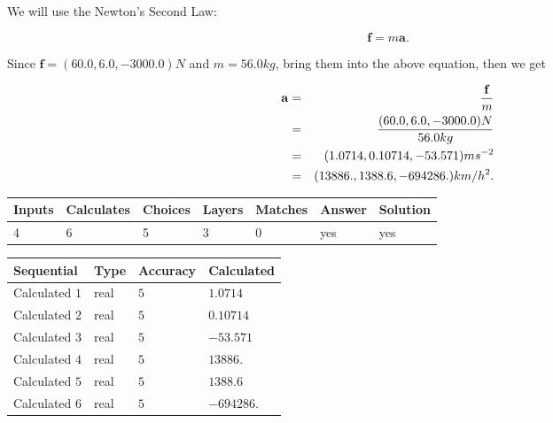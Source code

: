 \documentclass[12pt]{article}
\begin{document}
 

We will use the Newton's Second Law:
 
\[
\mathbf{f}=m\mathbf{a}.
\]
 
Since $\mathbf{f}=( %
60.0,  %
6.0,  %
-3000.0 )N$
and $m= %
56.0kg$, bring them into the above equation, then we get
 
\begin{eqnarray*}
\mathbf{a}&=&\frac{\mathbf{f}}m  \\
&=&\frac{(
60.0 ,
6.0 ,
-3000.0 )N
}{ %
56.0 kg}  \\
&=&(
1.0714 ,
0.10714,
-53.571
)ms^{-2} \\
&=&(
13886. ,
1388.6 ,
-694286.
)km/h^2.
\end{eqnarray*}
 
 
 
\noindent{}
 
 

 
\vspace{0.3in}
   
   
   
   
\noindent\begin{tabular}{|l|l|l|l|l|l|l|}
 \hline
Inputs & Calculates & Choices & Layers & Matches & Answer & Solution \\ \hline
           4  & 
           6  & 
           5
  & 
           3  & 
           0  & 
  yes & 
  yes 
  \\ \hline
 \end{tabular}
   
   
   
   
\noindent{}
   
   
  
  
\noindent\begin{tabular}{|l|l|l|l|}
\hline
 Sequential & Type & Accuracy & Calculated \\ 
\hline
 
 
  Calculated $            1 $ & real & $            5  $ & 
 $ 1.0714 $ 
 \\  \hline  
 
 
  Calculated $            2 $ & real & $            5  $ & 
 $ 0.10714 $ 
 \\  \hline  
 
 
  Calculated $            3 $ & real & $            5  $ & 
 $ -53.571 $ 
 \\  \hline  
 
 
  Calculated $            4 $ & real & $            5  $ & 
 $ 13886. $ 
 \\  \hline  
 
 
  Calculated $            5 $ & real & $            5  $ & 
 $ 1388.6 $ 
 \\  \hline  
 
 
  Calculated $            6 $ & real & $            5  $ & 
 $ -694286. $ 
 \\  \hline  
 \end{tabular}
   
\end{document}

